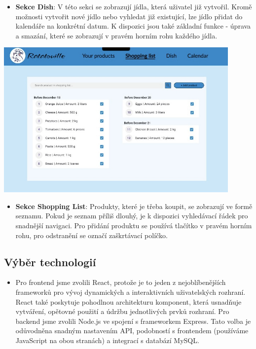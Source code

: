 \documentclass[a4paper,12pt]{article}
\begin{document}
\begin{itemize}
    \item \textbf{Sekce Dish}: V této sekci se zobrazují jídla, která uživatel již vytvořil. Kromě možnosti vytvořit nové jídlo nebo vyhledat již existující, lze jídlo přidat do kalendáře na konkrétní datum. K dispozici jsou také základní funkce - úprava a smazání, které se zobrazují v pravém horním rohu každého jídla.
\end{itemize}
\begin{center}
\includegraphics[width=0.9\textwidth]{shopping_list.JPG}
\end{center}
\begin{itemize}
    \item \textbf{Sekce Shopping List}: Produkty, které je třeba koupit, se zobrazují ve formě seznamu. Pokud je seznam příliš dlouhý, je k dispozici vyhledávací řádek pro snadnější navigaci. Pro přidání produktu se používá tlačítko v pravém horním rohu, pro odstranění se označí zaškrtávací políčko.
\end{itemize}
\subsection*{Výběr technologií}
\begin{itemize}
    \item Pro frontend jsme zvolili React, protože je to jeden z nejoblíbenějších frameworků pro vývoj dynamických a interaktivních uživatelských rozhraní. 
React také poskytuje pohodlnou architekturu komponent, která usnadňuje vytváření, opětovné použití a údržbu jednotlivých prvků rozhraní. Pro backend jsme zvolili Node.js ve spojení s frameworkem Express. Tato volba je odůvodněna snadným nastavením API, podobností s frontendem (používáme JavaScript na obou stranách) a integrací s databází MySQL.
\end{itemize}
\end{document}
